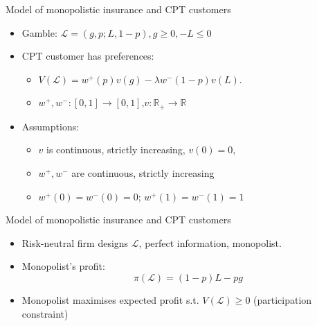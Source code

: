 \documentclass[11pt, aspectratio=169]{beamer}
\begin{document}
       \begin{frame}{Model of monopolistic insurance and CPT customers}
           \begin{itemize}
               \item Gamble: $\mathcal{L} =(g, p; L, 1 - p), g \geq 0, -L\leq 0 $\medskip
               \item CPT  customer has preferences:\medskip
               \begin{itemize}
                \item $V(\mathcal{L} )= w^{+}(p)v(g)-\lambda w^{-}(1-p)v(L).$\medskip
                \item $w^{+},w^{-}:[0,1] \longrightarrow [0,1]$,\quad $ v:\mathbb{R}_{+} \longrightarrow \mathbb{R}$\medskip
               \end{itemize}\medskip
               \item Assumptions:\medskip
               \begin{itemize}
                \item $v$ is continuous, strictly increasing, $v(0)=0$,\medskip
                \item $ w^{+},w^{-}$ are continuous, strictly increasing\medskip
                \item $w^{+}(0)=w^{-}(0)=0$; $w^{+}(1)=w^{-}(1)=1$\medskip
               \end{itemize}
           \end{itemize}
       \end{frame}

       \begin{frame}{Model of monopolistic insurance and CPT customers}
        \begin{itemize}
            \item Risk-neutral firm designs $\mathcal{L}$, perfect information, monopolist.\bigskip
            \item Monopolist's profit: \[\pi(\mathcal{L})=(1-p)L-pg\]\bigskip
            \item Monopolist maximises expected profit s.t. $V(\mathcal{L})\geq 0$ (participation constraint)\bigskip
        \end{itemize}
    \end{frame}
\end{document}
